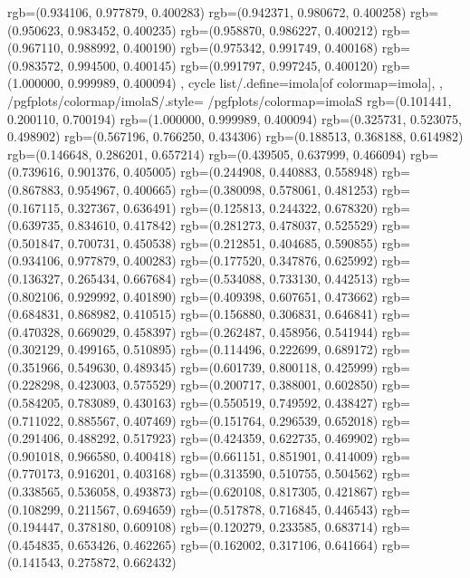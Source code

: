 {{{					rgb=(0.934106, 0.977879, 0.400283)
					rgb=(0.942371, 0.980672, 0.400258)
					rgb=(0.950623, 0.983452, 0.400235)
					rgb=(0.958870, 0.986227, 0.400212)
					rgb=(0.967110, 0.988992, 0.400190)
					rgb=(0.975342, 0.991749, 0.400168)
					rgb=(0.983572, 0.994500, 0.400145)
					rgb=(0.991797, 0.997245, 0.400120)
					rgb=(1.000000, 0.999989, 0.400094)
			},
		cycle list/.define={imola}{[of colormap=imola]},
		},
		/pgfplots/colormap/imolaS/.style={
			/pgfplots/colormap={imolaS}{%
					rgb=(0.101441, 0.200110, 0.700194)
					rgb=(1.000000, 0.999989, 0.400094)
					rgb=(0.325731, 0.523075, 0.498902)
					rgb=(0.567196, 0.766250, 0.434306)
					rgb=(0.188513, 0.368188, 0.614982)
					rgb=(0.146648, 0.286201, 0.657214)
					rgb=(0.439505, 0.637999, 0.466094)
					rgb=(0.739616, 0.901376, 0.405005)
					rgb=(0.244908, 0.440883, 0.558948)
					rgb=(0.867883, 0.954967, 0.400665)
					rgb=(0.380098, 0.578061, 0.481253)
					rgb=(0.167115, 0.327367, 0.636491)
					rgb=(0.125813, 0.244322, 0.678320)
					rgb=(0.639735, 0.834610, 0.417842)
					rgb=(0.281273, 0.478037, 0.525529)
					rgb=(0.501847, 0.700731, 0.450538)
					rgb=(0.212851, 0.404685, 0.590855)
					rgb=(0.934106, 0.977879, 0.400283)
					rgb=(0.177520, 0.347876, 0.625992)
					rgb=(0.136327, 0.265434, 0.667684)
					rgb=(0.534088, 0.733130, 0.442513)
					rgb=(0.802106, 0.929992, 0.401890)
					rgb=(0.409398, 0.607651, 0.473662)
					rgb=(0.684831, 0.868982, 0.410515)
					rgb=(0.156880, 0.306831, 0.646841)
					rgb=(0.470328, 0.669029, 0.458397)
					rgb=(0.262487, 0.458956, 0.541944)
					rgb=(0.302129, 0.499165, 0.510895)
					rgb=(0.114496, 0.222699, 0.689172)
					rgb=(0.351966, 0.549630, 0.489345)
					rgb=(0.601739, 0.800118, 0.425999)
					rgb=(0.228298, 0.423003, 0.575529)
					rgb=(0.200717, 0.388001, 0.602850)
					rgb=(0.584205, 0.783089, 0.430163)
					rgb=(0.550519, 0.749592, 0.438427)
					rgb=(0.711022, 0.885567, 0.407469)
					rgb=(0.151764, 0.296539, 0.652018)
					rgb=(0.291406, 0.488292, 0.517923)
					rgb=(0.424359, 0.622735, 0.469902)
					rgb=(0.901018, 0.966580, 0.400418)
					rgb=(0.661151, 0.851901, 0.414009)
					rgb=(0.770173, 0.916201, 0.403168)
					rgb=(0.313590, 0.510755, 0.504562)
					rgb=(0.338565, 0.536058, 0.493873)
					rgb=(0.620108, 0.817305, 0.421867)
					rgb=(0.108299, 0.211567, 0.694659)
					rgb=(0.517878, 0.716845, 0.446543)
					rgb=(0.194447, 0.378180, 0.609108)
					rgb=(0.120279, 0.233585, 0.683714)
					rgb=(0.454835, 0.653426, 0.462265)
					rgb=(0.162002, 0.317106, 0.641664)
					rgb=(0.141543, 0.275872, 0.662432)
}}}
